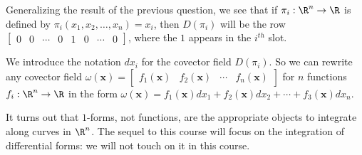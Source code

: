 \documentclass{ximera}
\begin{document}
	Generalizing the result of the previous question, we see that if $\pi_i:\R^n \to \R$ is defined by $\pi_i(x_1,x_2,\ldots,x_n) = x_i$, then $D(\pi_i)$ will
	be the row $\begin{bmatrix} 0&0& \cdots &0&1&0& \cdots &0\end{bmatrix}$, where the $1$ appears in the $i^{th}$ slot.
	
	We introduce the notation $dx_i$ for the covector field $D(\pi_i)$.  So we can rewrite any covector field 
	$\omega(\mathbf{x}) = \begin{bmatrix} f_1(\mathbf{x}) &  f_2(\mathbf{x}) & \cdots &  f_n(\mathbf{x})  \end{bmatrix}$ for $n$ functions $f_i:\R^n \to \R$
	in the form $\omega(\mathbf{x}) = f_1(\mathbf{x})dx_1+f_2(\mathbf{x})dx_2+ \cdots +f_3(\mathbf{x})dx_n$.
	
	It turns out that $1$-forms, not functions, are the appropriate objects to integrate along curves in $\R^n$. 
	The sequel to this course will focus on the integration of differential forms:  we will not touch on it in this course.
\end{document}
